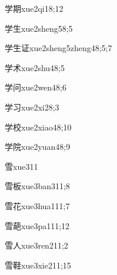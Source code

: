 \begin{verbete}{学期}{xue2qi1}{8;12}
\end{verbete}
\begin{verbete}{学生}{xue2sheng5}{8;5}
\end{verbete}
\begin{verbete}{学生证}{xue2sheng5zheng4}{8;5;7}
\end{verbete}
\begin{verbete}{学术}{xue2shu4}{8;5}
\end{verbete}
\begin{verbete}{学问}{xue2wen4}{8;6}
\end{verbete}
\begin{verbete}{学习}{xue2xi2}{8;3}
\end{verbete}
\begin{verbete}{学校}{xue2xiao4}{8;10}
\end{verbete}
\begin{verbete}{学院}{xue2yuan4}{8;9}
\end{verbete}
\begin{verbete}{雪}{xue3}{11}
\end{verbete}
\begin{verbete}{雪板}{xue3ban3}{11;8}
\end{verbete}
\begin{verbete}{雪花}{xue3hua1}{11;7}
\end{verbete}
\begin{verbete}{雪葩}{xue3pa1}{11;12}
\end{verbete}
\begin{verbete}{雪人}{xue3ren2}{11;2}
\end{verbete}
\begin{verbete}{雪鞋}{xue3xie2}{11;15}
\end{verbete}

